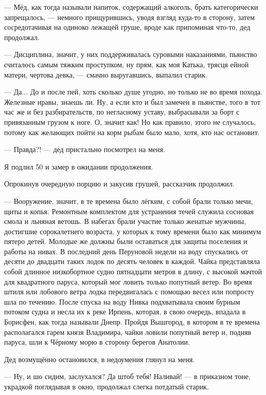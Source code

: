 — Мёд, как тогда называли напиток, содержащий алкоголь, брать категорически
запрещалось, — немного прищурившись, уводя взгляд куда-то в сторону, затем
сосредотачивая на одиноко лежащей груше, вроде как припоминая что-то, дед
продолжал.

— Дисциплина, значит, у них поддерживалась суровыми наказаниями, пьянство
считалось самым тяжким проступком, ну прям, как моя Катька, трясця ейной
матери, чертова девка, — смачно выругавшись, выпалил старик.

— Да... До и после пей, хоть сколько душе угодно, но только не во время похода.
Железные нравы, знаешь ли. Ну, а если кто и был замечен в пьянстве, того в тот
час же и без разбирательств, по негласному уставу, выбрасывали за борт с
привязанным грузом к ноге. О, значит как! Но как правило, этого не случалось,
потому как желающих пойти на корм рыбам было мало, хотя, кто нас остановит.

— Правда?! — дед пристально посмотрел на меня.

Я подлил 50 и замер в ожидании продолжения.

Опрокинув очередную порцию и закусив грушей, рассказчик продолжил.

— Вооружение, значит, в те времена было лёгким, с собой брали только мечи, щиты
и копья. Ремонтным комплектом для устранения течей служила сосновая смола и
льняная ветошь. В набегах брали участие только женатые мужчины, достигшие
сорокалетнего возраста, у которых к тому времени было как минимум пятеро детей.
Молодые же должны были оставаться для защиты поселения и работы на нивах. В
последний день Перуновой недели на воду спускались от десяти до двадцати таких
лодок по десять человек в каждой. Чайка представляла собой длинное низкобортное
судно пятнадцати метров в длину, с высокой мачтой для квадратного паруса,
который мог ловить только попутный ветер. Во время штиля или лобового ветра
лодка передвигалась с помощью весел или попросту шла по течению. После спуска
на воду Нивка подхватывала своим бурным потоком судна и несла их к реке Ирпень,
которая, в свою очередь, впадала в Борисфен, как тогда называли Днепр. Пройдя
Вышгород, в котором в те времена располагался гарем князя Владимира, чайки
ловили попутный ветер и, подняв паруса, шли к Чёрному морю в сторону берегов
Анатолии.

Дед возмущённо остановился, в недоумения глянул на меня.

— Ну, и шо сидим, заслухался? Да штоб тебя! Наливай! — в приказном тоне,
украдкой поглядывая в окно, продолжал слегка потдатый старик.

